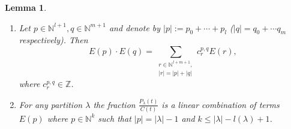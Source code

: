 \documentclass[12pt]{amsart}
\theoremstyle{plain}
\newtheorem{lemma}{Lemma}[section]
\theoremstyle{remark}
\newcommand{\N}{\mathbb{N}}
\newcommand{\Z}{\mathbb{Z}}
\begin{document}
\begin{lemma}
\label{lem:admissible}
\
\begin{enumerate}[label=(\alph*)]
 \item \label{admissible:A}
Let $p \in \N^{l+1}, q \in \N^{m+1}$ and denote by $|p| := p_0 + \cdots + p_l$
($|q| = q_0 + \cdots q_m$ respectively). Then
$$E(p)\cdot E(q) = \sum_{\substack{r \in \N^{l+m+1}, \\ |r| = |p|+|q|}}c^{p,q}_r
E(r),$$
where $c^{p,q}_r \in \Z$.
\item \label{admissible:B}
For any partition $\lambda$ the fraction $\frac{P_{\lambda}(t)}{C(t)}$
is a linear combination of terms $E(p)$ where $p \in \N^k$ such that $|p| =
|\lambda|-1$ and $k \leq| \lambda|-l(\lambda)+1$.
\end{enumerate}
\end{lemma}
\end{document}
